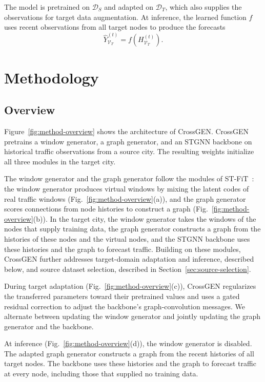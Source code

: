 \documentclass[runningheads,a4paper]{llncs}
\begin{document}
The model is pretrained on $\mathcal D_S$ and adapted on $\mathcal D_T$, which also supplies the observations for target data augmentation. At inference, the learned function $f$ uses recent observations from all target nodes to produce the forecasts
\[
  \widehat Y_{\mathcal V_T}^{(t)}=f\!\left(H_{\mathcal V_T}^{(t)}\right).
\]

\section{Methodology}\label{sec:method}
\subsection{Overview}

\label{sec:transfer-workflow}

Figure~\ref{fig:method-overview} shows the architecture of CrossGEN. CrossGEN pretrains a window generator, a graph generator, and an STGNN backbone on historical traffic observations from a source city. The resulting weights initialize all three modules in the target city.

The window generator and the graph generator follow the modules of ST-FiT~\cite{stfit}: the window generator produces virtual windows by mixing the latent codes of real traffic windows (Fig.~\ref{fig:method-overview}(a)), and the graph generator scores connections from node histories to construct a graph (Fig.~\ref{fig:method-overview}(b)). In the target city, the window generator takes the windows of the nodes that supply training data, the graph generator constructs a graph from the histories of these nodes and the virtual nodes, and the STGNN backbone uses these histories and the graph to forecast traffic. Building on these modules, CrossGEN further addresses target-domain adaptation and inference, described below, and source dataset selection, described in Section~\ref{sec:source-selection}.

During target adaptation (Fig.~\ref{fig:method-overview}(c)), CrossGEN regularizes the transferred parameters toward their pretrained values and uses a gated residual correction to adjust the backbone's graph-convolution messages. We alternate between updating the window generator and jointly updating the graph generator and the backbone.

At inference (Fig.~\ref{fig:method-overview}(d)), the window generator is disabled. The adapted graph generator constructs a graph from the recent histories of all target nodes. The backbone uses these histories and the graph to forecast traffic at every node, including those that supplied no training data.
\end{document}
